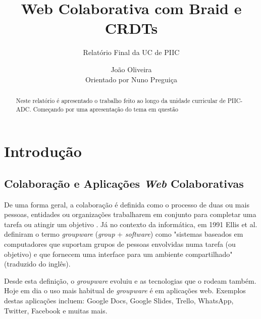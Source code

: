 \documentclass[runningheads]{llncs}
\begin{document}
%
    \title{Web Colaborativa com Braid e CRDTs} 
    \subtitle{Relatório Final da UC de PIIC}
    \author{João Oliveira\\Orientado por Nuno Preguiça}
    \maketitle              %
    \begin{abstract}
        Neste relatório é apresentado o trabalho feito ao longo da unidade curricular de PIIC-ADC. Começando por uma apresentação do tema em questão

    \end{abstract}
    \section{Introdução}    

        \subsection{Colaboração e Aplicações {\itshape Web} Colaborativas}

        De uma forma geral, a colaboração é definida como o processo de duas ou mais pessoas, 
        entidades ou organizações trabalharem em conjunto para completar uma tarefa ou atingir 
        um objetivo \cite{collab-def}. 
        Já no contexto da informática, em 1991 Ellis et al. definiram o termo 
        {\itshape groupware} ({\itshape group} + {\itshape software}) como "sistemas baseados 
        em computadores que suportam grupos de pessoas envolvidas numa tarefa (ou objetivo) e 
        que fornecem uma interface para um ambiente compartilhado"\cite{groupware-def} 
        (traduzido do inglês). 

        Desde esta definição, o {\itshape groupware} evoluiu e as tecnologias que o rodeam 
        também. Hoje em dia o uso mais habitual de {\itshape groupware} é em aplicações web. 
        Exemplos destas aplicações incluem: Google Docs, Google Slides, Trello, WhatsApp, 
        Twitter, Facebook e muitas mais. 
\end{document}
